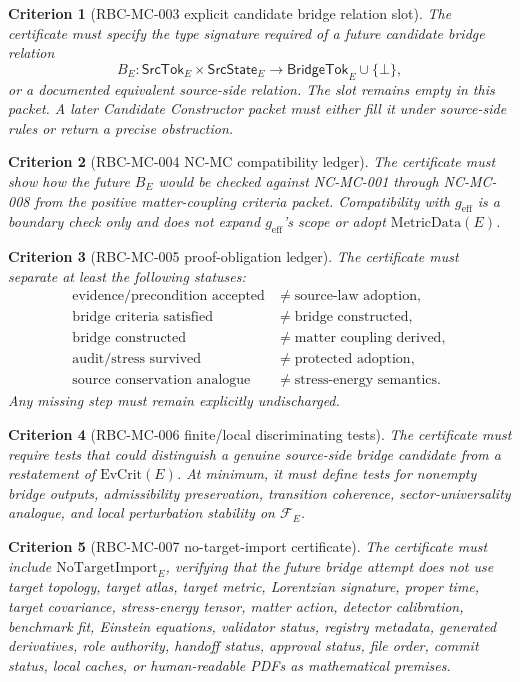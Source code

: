 \documentclass[11pt]{article}
\newtheorem{criterion}{Criterion}
\newcommand{\MetricData}{\mathrm{MetricData}}
\newcommand{\geff}{g_{\mathrm{eff}}}
\newcommand{\EvCrit}{\mathrm{EvCrit}}
\newcommand{\NoTargetImport}{\mathrm{NoTargetImport}}
\begin{document}
\begin{criterion}[RBC-MC-003 explicit candidate bridge relation slot]
The certificate must specify the type signature required of a future
candidate bridge relation
\[
  B_E:\mathsf{SrcTok}_E \times \mathsf{SrcState}_E
  \longrightarrow \mathsf{BridgeTok}_E \cup \{\bot\},
\]
or a documented equivalent source-side relation. The slot remains empty in
this packet. A later Candidate Constructor packet must either fill it under
source-side rules or return a precise obstruction.
\end{criterion}

\begin{criterion}[RBC-MC-004 NC-MC compatibility ledger]
The certificate must show how the future \(B_E\) would be checked against
NC-MC-001 through NC-MC-008 from the positive matter-coupling criteria packet.
Compatibility with \(\geff\) is a boundary check only and does not expand
\(\geff\)'s scope or adopt \(\MetricData(E)\).
\end{criterion}

\begin{criterion}[RBC-MC-005 proof-obligation ledger]
The certificate must separate at least the following statuses:
\[
\begin{array}{ll}
\text{evidence/precondition accepted} & \neq \text{source-law adoption},\\
\text{bridge criteria satisfied} & \neq \text{bridge constructed},\\
\text{bridge constructed} & \neq \text{matter coupling derived},\\
\text{audit/stress survived} & \neq \text{protected adoption},\\
\text{source conservation analogue} & \neq \text{stress-energy semantics}.
\end{array}
\]
Any missing step must remain explicitly undischarged.
\end{criterion}

\begin{criterion}[RBC-MC-006 finite/local discriminating tests]
The certificate must require tests that could distinguish a genuine
source-side bridge candidate from a restatement of \(\EvCrit(E)\). At minimum,
it must define tests for nonempty bridge outputs, admissibility preservation,
transition coherence, sector-universality analogue, and local perturbation
stability on \(\mathcal{F}_E\).
\end{criterion}

\begin{criterion}[RBC-MC-007 no-target-import certificate]
The certificate must include \(\NoTargetImport_E\), verifying that the future
bridge attempt does not use target topology, target atlas, target metric,
Lorentzian signature, proper time, target covariance, stress-energy tensor,
matter action, detector calibration, benchmark fit, Einstein equations,
validator status, registry metadata, generated derivatives, role authority,
handoff status, approval status, file order, commit status, local caches, or
human-readable PDFs as mathematical premises.
\end{criterion}
\end{document}
